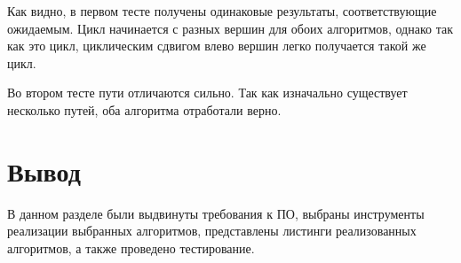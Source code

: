 \newpage
Как видно, в первом тесте получены одинаковые результаты, соответствующие ожидаемым. Цикл начинается с разных вершин для обоих алгоритмов, однако так как это цикл, циклическим сдвигом влево вершин легко получается такой же цикл.

Во втором тесте пути отличаются сильно. Так как изначально существует несколько путей, оба алгоритма отработали верно.


\section{Вывод}
В данном разделе были выдвинуты требования к ПО, выбраны инструменты реализации выбранных алгоритмов, представлены листинги реализованных алгоритмов, а также проведено тестирование.
